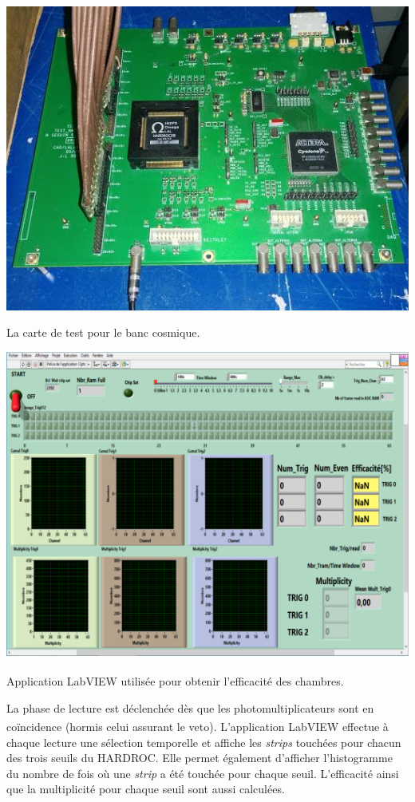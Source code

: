 \noindent
\begin{minipage}[t]{.48\textwidth}
	\noindent
	\centering
	\includegraphics[width=1\textwidth]{GLA/carte.jpg}
	\captionsetup{type=figure}\caption{La carte de test pour le banc cosmique.}
	\label{carte}
\end{minipage}%
\hfill
\begin{minipage}[t]{.48\textwidth}
	\noindent
	\centering
	\includegraphics[width=1\textwidth]{GLA/labview.png}
	\captionsetup{type=figure}\caption{Application LabVIEW\textsuperscript{\textregistered} utilisée pour obtenir l'efficacité des chambres.}
	\label{labview}
\end{minipage}

La phase de lecture est déclenchée dès que les photomultiplicateurs sont en coïncidence (hormis celui assurant le veto). L'application LabVIEW\textsuperscript{\textregistered} effectue à chaque lecture une sélection temporelle et affiche les \textit{strips} touchées pour chacun des trois seuils du HARDROC. Elle permet également d'afficher l'histogramme du nombre de fois où une \textit{strip} a été touchée pour chaque seuil. L'efficacité ainsi que la multiplicité pour chaque seuil sont aussi calculées.

